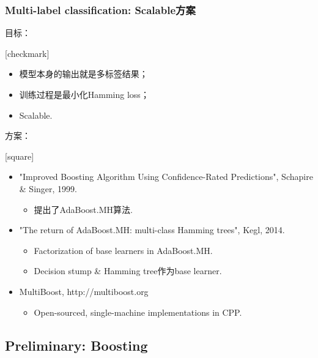 \documentclass{beamer}
\begin{document}
\begin{frame}
\frametitle{Multi-label classification: Scalable方案}
目标：
  {
    [checkmark]
    \begin{itemize}
      \item 模型本身的输出就是多标签结果；
      \item 训练过程是最小化Hamming loss；
      \item Scalable.
    \end{itemize}
  }
\pause

方案：
  {
    [square]
    \begin{itemize}
      \item {\color{purple} "Improved Boosting Algorithm Using Confidence-Rated Predictions", Schapire \& Singer, 1999.}
      \begin{itemize}
        \item 提出了AdaBoost.MH算法.
      \end{itemize}
      \item {\color{purple} "The return of AdaBoost.MH: multi-class Hamming trees", Kegl, 2014.}
      \begin{itemize}
        \item Factorization of base learners in AdaBoost.MH.
        \item Decision stump \& Hamming tree作为base learner.
      \end{itemize}
      \item {\color{purple} MultiBoost, http://multiboost.org}
      \begin{itemize}
        \item Open-sourced, single-machine implementations in CPP.
      \end{itemize}
    \end{itemize}
  }
\end{frame}


\subsection{Preliminary: Boosting}
\end{document}
